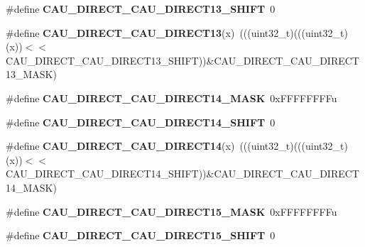 \begin{DoxyCompactItemize}
\item 
\#define {\bfseries C\+A\+U\+\_\+\+D\+I\+R\+E\+C\+T\+\_\+\+C\+A\+U\+\_\+\+D\+I\+R\+E\+C\+T13\+\_\+\+S\+H\+I\+FT}~0\hypertarget{group__CAU__Register__Masks_ga941037be28db6fbd833f5202ad2f21a5}{}\label{group__CAU__Register__Masks_ga941037be28db6fbd833f5202ad2f21a5}

\item 
\#define {\bfseries C\+A\+U\+\_\+\+D\+I\+R\+E\+C\+T\+\_\+\+C\+A\+U\+\_\+\+D\+I\+R\+E\+C\+T13}(x)~(((uint32\+\_\+t)(((uint32\+\_\+t)(x))$<$$<$C\+A\+U\+\_\+\+D\+I\+R\+E\+C\+T\+\_\+\+C\+A\+U\+\_\+\+D\+I\+R\+E\+C\+T13\+\_\+\+S\+H\+I\+FT))\&C\+A\+U\+\_\+\+D\+I\+R\+E\+C\+T\+\_\+\+C\+A\+U\+\_\+\+D\+I\+R\+E\+C\+T13\+\_\+\+M\+A\+SK)\hypertarget{group__CAU__Register__Masks_ga4ad6c63ec619cc20c8d34c230907cb72}{}\label{group__CAU__Register__Masks_ga4ad6c63ec619cc20c8d34c230907cb72}

\item 
\#define {\bfseries C\+A\+U\+\_\+\+D\+I\+R\+E\+C\+T\+\_\+\+C\+A\+U\+\_\+\+D\+I\+R\+E\+C\+T14\+\_\+\+M\+A\+SK}~0x\+F\+F\+F\+F\+F\+F\+F\+Fu\hypertarget{group__CAU__Register__Masks_ga8145212bbedada0193bfa6042ea637a6}{}\label{group__CAU__Register__Masks_ga8145212bbedada0193bfa6042ea637a6}

\item 
\#define {\bfseries C\+A\+U\+\_\+\+D\+I\+R\+E\+C\+T\+\_\+\+C\+A\+U\+\_\+\+D\+I\+R\+E\+C\+T14\+\_\+\+S\+H\+I\+FT}~0\hypertarget{group__CAU__Register__Masks_ga017a8a273655c5f491aa2b348b1ed9bc}{}\label{group__CAU__Register__Masks_ga017a8a273655c5f491aa2b348b1ed9bc}

\item 
\#define {\bfseries C\+A\+U\+\_\+\+D\+I\+R\+E\+C\+T\+\_\+\+C\+A\+U\+\_\+\+D\+I\+R\+E\+C\+T14}(x)~(((uint32\+\_\+t)(((uint32\+\_\+t)(x))$<$$<$C\+A\+U\+\_\+\+D\+I\+R\+E\+C\+T\+\_\+\+C\+A\+U\+\_\+\+D\+I\+R\+E\+C\+T14\+\_\+\+S\+H\+I\+FT))\&C\+A\+U\+\_\+\+D\+I\+R\+E\+C\+T\+\_\+\+C\+A\+U\+\_\+\+D\+I\+R\+E\+C\+T14\+\_\+\+M\+A\+SK)\hypertarget{group__CAU__Register__Masks_ga76ec783a1eb1195dc4e7bb7bd9ca654e}{}\label{group__CAU__Register__Masks_ga76ec783a1eb1195dc4e7bb7bd9ca654e}

\item 
\#define {\bfseries C\+A\+U\+\_\+\+D\+I\+R\+E\+C\+T\+\_\+\+C\+A\+U\+\_\+\+D\+I\+R\+E\+C\+T15\+\_\+\+M\+A\+SK}~0x\+F\+F\+F\+F\+F\+F\+F\+Fu\hypertarget{group__CAU__Register__Masks_gabd722971e5e62de19fda379b987cf321}{}\label{group__CAU__Register__Masks_gabd722971e5e62de19fda379b987cf321}

\item 
\#define {\bfseries C\+A\+U\+\_\+\+D\+I\+R\+E\+C\+T\+\_\+\+C\+A\+U\+\_\+\+D\+I\+R\+E\+C\+T15\+\_\+\+S\+H\+I\+FT}~0\hypertarget{group__CAU__Register__Masks_ga33f80687a392b95e7b5a8d15530cc2cf}{}\label{group__CAU__Register__Masks_ga33f80687a392b95e7b5a8d15530cc2cf}


\end{DoxyCompactItemize}
